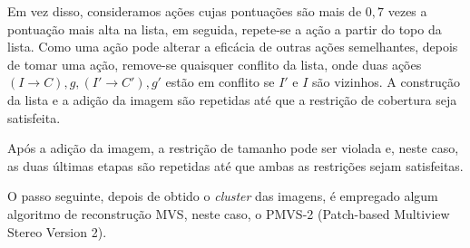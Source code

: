 \begin{itemize}

Em vez disso, consideramos ações cujas pontuações são mais de $0,7$ vezes a pontuação mais alta na lista, em seguida, repete-se a ação a partir do topo da lista. Como uma ação pode alterar a eficácia de outras ações semelhantes, depois de tomar uma ação, remove-se quaisquer conflito da lista, onde duas ações ${(I \rightarrow C), g}, {(I' \rightarrow C'), g' }$ estão em conflito se $I'$ e $I$ são vizinhos. A construção da lista e a adição da imagem são repetidas até que a restrição de cobertura seja satisfeita.

Após a adição da imagem, a restrição de tamanho pode ser violada e, neste caso, as duas últimas etapas são repetidas até que ambas as restrições sejam satisfeitas.

O passo seguinte, depois de obtido o {\it cluster} das imagens, é empregado algum algoritmo de reconstrução MVS, neste caso, o PMVS-2 (Patch-based Multiview Stereo Version 2).


\end{itemize}
